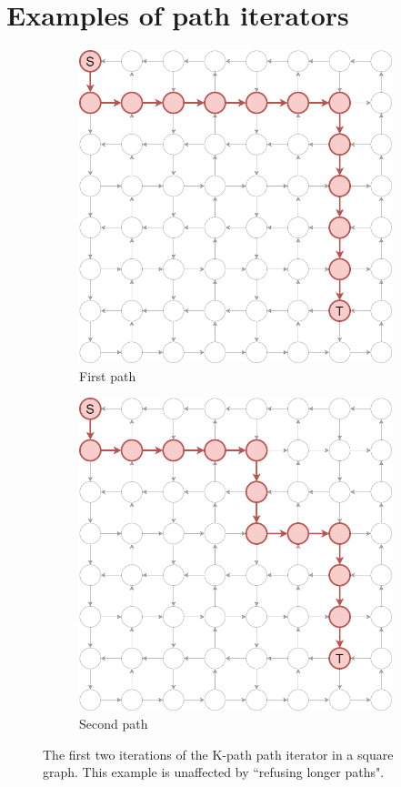 \section{Examples of path iterators}
\label{app:pathIteratorExamples}
\begin{figure}[ht]
\begin{subfigure}{.5\textwidth}
  \centering
\includegraphics[width=0.8\linewidth]{images/pathiterators/examples-kpath-1.png}
  \caption{First path}
\end{subfigure}
\begin{subfigure}{.5\textwidth}
  \centering
\includegraphics[width=0.8\linewidth]{images/pathiterators/examples-kpath-2.png}
  \caption{Second path}
\end{subfigure}
\caption{The first two iterations of the K-path path iterator in a square graph. This example is unaffected by ``refusing longer paths".}
\label{fig:pathexamples-kpath}
\end{figure}

